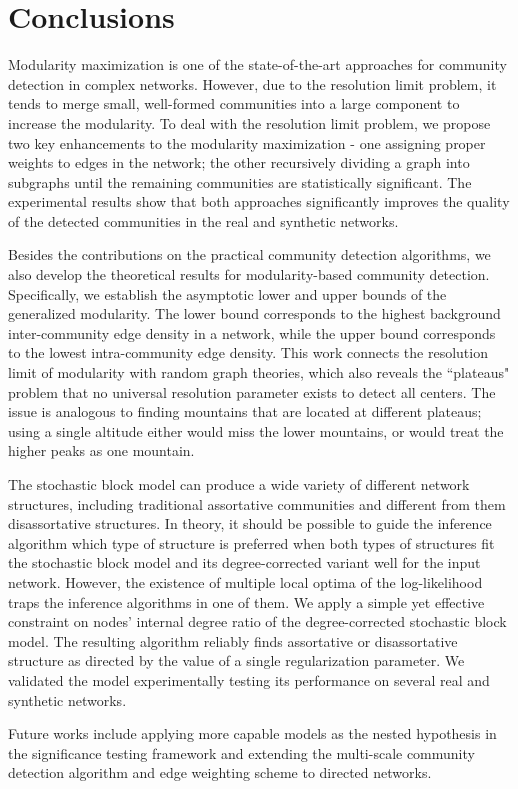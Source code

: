 \section{Conclusions} \label{sec:2.7}
Modularity maximization is one of the state-of-the-art approaches for community detection in complex networks. However, due to the resolution limit problem, it tends to merge small, well-formed communities into a large component to increase the modularity. To deal with the resolution limit problem, we propose two key enhancements to the modularity maximization - one assigning proper weights to edges in the network; the other recursively dividing a graph into subgraphs until the remaining communities are statistically significant. The experimental results show that both approaches significantly improves the quality of the detected communities in the real and synthetic networks.

Besides the contributions on the practical community detection algorithms, we also develop the theoretical results for modularity-based community detection. Specifically, we establish the asymptotic lower and upper bounds of the generalized modularity. The lower bound corresponds to the highest background inter-community edge density in a network, while the upper bound corresponds to the lowest intra-community edge density. This work connects the resolution limit of modularity with random graph theories, which also reveals the ``plateaus" problem that no universal resolution parameter exists to detect all centers. The issue is analogous to finding mountains that are located at different plateaus; using a single altitude either would miss the lower mountains, or would treat the higher peaks as one mountain.

The stochastic block model can produce a wide variety of different network structures, including traditional assortative communities and different from them disassortative structures. In theory, it should be possible to guide the inference algorithm which type of structure is preferred when both types of structures fit the stochastic block model and its degree-corrected variant well for the input network. However, the existence of multiple local optima of the log-likelihood traps the inference algorithms in one of them. We apply a simple yet effective constraint on nodes' internal degree ratio of the degree-corrected stochastic block model. The resulting algorithm reliably finds assortative or disassortative structure as directed by the value of a single regularization parameter. We validated the model experimentally testing its performance on several real and synthetic networks.

Future works include applying more capable models as the nested hypothesis in the significance testing framework and extending the multi-scale community detection algorithm and edge weighting scheme to directed networks.

